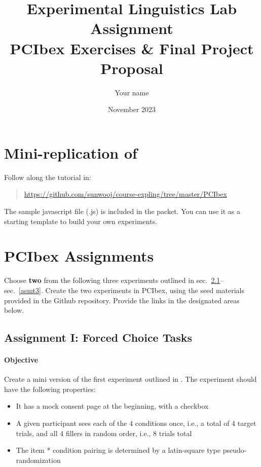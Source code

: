 \documentclass{article}
\title{Experimental Linguistics Lab Assignment \\ PCIbex Exercises \& Final Project Proposal}
\date{November 2023}
\author{Your name}
\begin{document}
\maketitle

\section{Mini-replication of \cite{sprouse2016}}

Follow along the tutorial in: 

\begin{quotation}
\noindent
\url{https://github.com/sunwooj/course-expling/tree/master/PCIbex}
\end{quotation}

\noindent The sample javascript file (.js) is included in the packet. You can use it as a starting template to build your own experiments.




\section{PCIbex Assignments}

Choose \textbf{two} from the following three experiments outlined in sec.~\ref{asmt1}--sec.~\ref{asmt3}. Create the two experiments in PCIbex, using the seed materials provided in the Github repository. Provide the links in the designated areas below.




\subsection{Assignment I: Forced Choice Tasks}\label{asmt1}

\paragraph{Objective} Create a mini version of the first experiment outlined in \cite{brasoveanu2015}. The experiment should have the following properties:

\begin{itemize}
    \item It has a mock consent page at the beginning, with a checkbox
    \item A given participant sees each of the 4 conditions once, i.e., a total of 4 target trials, and all 4 fillers in random order, i.e., 8 trials total
    \item The item * condition pairing is determined by a latin-square type pseudo-randomization
\end{itemize}
\end{document}

